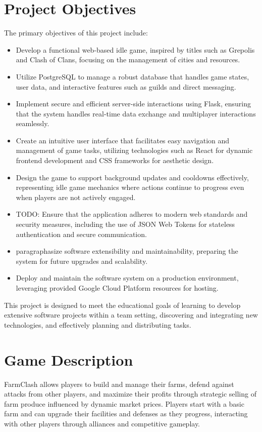 \documentclass[12pt]{article}
\begin{document}
\section{Project Objectives}
The primary objectives of this project include:
\begin{itemize}
    \item Develop a functional web-based idle game, inspired by titles such as Grepolis and Clash of Clans, focusing on the management of cities and resources.
    \item Utilize PostgreSQL to manage a robust database that handles game states, user data, and interactive features such as guilds and direct messaging.
    \item Implement secure and efficient server-side interactions using Flask, ensuring that the system handles real-time data exchange and multiplayer interactions seamlessly.
    \item Create an intuitive user interface that facilitates easy navigation and management of game tasks, utilizing technologies such as React for dynamic frontend development and CSS frameworks for aesthetic design.
    \item Design the game to support background updates and cooldowns effectively, representing idle game mechanics where actions continue to progress even when players are not actively engaged.
    \item TODO: Ensure that the application adheres to modern web standards and security measures, including the use of JSON Web Tokens for stateless authentication and secure communication.
    \item paragraphasize software extensibility and maintainability, preparing the system for future upgrades and scalability.
    \item Deploy and maintain the software system on a production environment, leveraging provided Google Cloud Platform resources for hosting.
\end{itemize}
This project is designed to meet the educational goals of learning to develop extensive software projects within a team setting, discovering and integrating new technologies, and effectively planning and distributing tasks.


\section{Game Description}
FarmClash allows players to build and manage their farms, defend against attacks from other players, and maximize their profits through strategic selling of farm produce influenced by dynamic market prices. Players start with a basic farm and can upgrade their facilities and defenses as they progress, interacting with other players through alliances and competitive gameplay.
\end{document}

